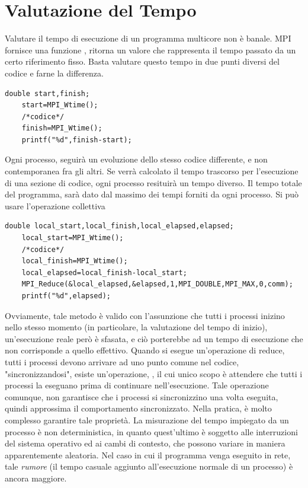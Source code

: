 \documentclass[10pt, letterpaper]{report}
\begin{document}
\section{Valutazione del Tempo}
Valutare il tempo di esecuzione di un programma multicore 
non è banale. MPI fornisce una funzione , 
ritorna un valore che rappresenta il tempo passato da un certo 
riferimento fisso. Basta valutare questo tempo in due punti diversi 
del codice e farne la differenza.
\begin{lstlisting}[style=CStyle]
    double start,finish;
    start=MPI_Wtime();
    /*codice*/
    finish=MPI_Wtime();
    printf("%d",finish-start);
\end{lstlisting}
Ogni processo, seguirà un evoluzione dello stesso codice differente, e 
non contemporanea fra gli altri. Se verrà calcolato il tempo 
trascorso per l'esecuzione di una sezione di codice, ogni processo 
resituirà un tempo diverso. Il tempo totale del programma, sarà 
dato dal massimo dei tempi forniti da ogni processo. Si può usare 
l'operazione collettiva 
\begin{lstlisting}[style=CStyle]
    double local_start,local_finish,local_elapsed,elapsed;
    local_start=MPI_Wtime();
    /*codice*/
    local_finish=MPI_Wtime();
    local_elapsed=local_finish-local_start;
    MPI_Reduce(&local_elapsed,&elapsed,1,MPI_DOUBLE,MPI_MAX,0,comm);
    printf("%d",elapsed);
\end{lstlisting}
Ovviamente, tale metodo è valido con l'assunzione che tutti i processi 
inizino nello stesso momento (in particolare, la valutazione del 
tempo di inizio), un'esecuzione reale però è sfasata, e 
ciò porterebbe ad un tempo di esecuzione che non corrisponde a quello 
effettivo.\acc 
Quando si esegue un'operazione di reduce, tutti i processi 
devono arrivare ad uno punto comune nel codice, "sincronizzandosi", 
esiste un'operazione, , il cui unico scopo è attendere che tutti i processi 
la eseguano prima di continuare nell'esecuzione. Tale operazione comunque, 
non garantisce che i processi si sincronizzino una volta eseguita, quindi 
approssima il comportamento sincronizzato. Nella pratica, è molto 
complesso garantire tale proprietà.\acc 
La misurazione del tempo impiegato da un processo è 
non deterministica, in quanto quest'ultimo è 
soggetto alle interruzioni del sistema operativo ed ai cambi di 
contesto, che possono variare in maniera apparentemente aleatoria. Nel 
caso in cui il programma venga eseguito in rete, tale \textit{rumore} 
(il tempo casuale aggiunto all'esecuzione normale di un processo) è ancora maggiore.
\end{document}
